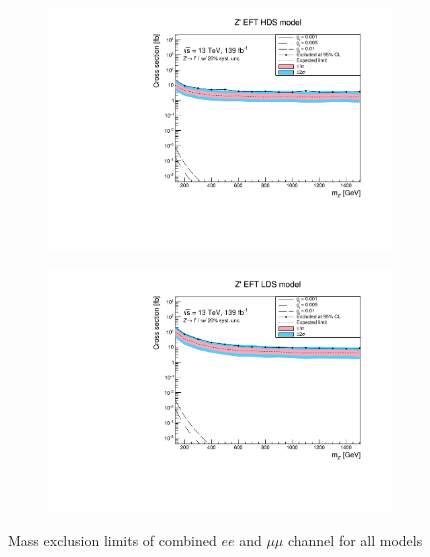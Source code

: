 \documentclass[12pt, a4paper]{book}
\begin{document}
\begin{figure}[!ht]
\begin{subfigure}[b]{0.49\textwidth}
      \includegraphics[width=1\textwidth]{Limits/EFT_HDS/mass_exclusion_comb.pdf}
   \end{subfigure}
   \hfill
   \begin{subfigure}[b]{0.49\textwidth}
      \centering
      \includegraphics[width=1\textwidth]{Limits/EFT_LDS/mass_exclusion_comb.pdf}
   \end{subfigure}
   \caption[Mass exclusion limits of combined $ee$ and $\mu\mu$ channel for all models]{Mass exclusion limits of combined $ee$ and $\mu\mu$ channel for all models}\label{fig:model_dep_exclusions}
\end{figure}
\clearpage
\end{document}
